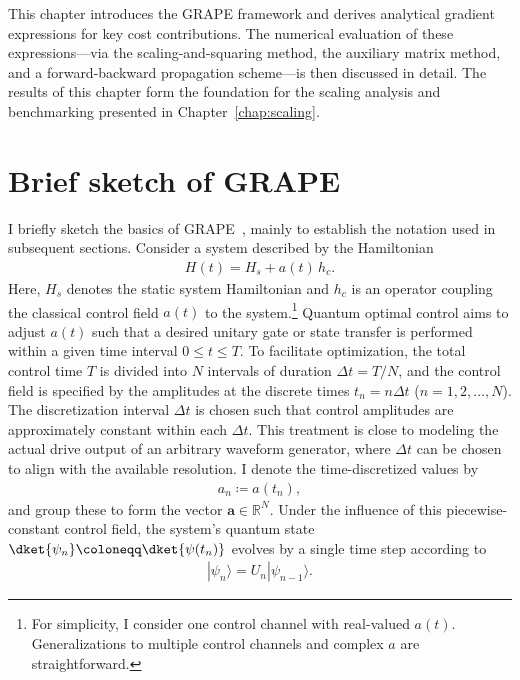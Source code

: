 This chapter introduces the GRAPE framework and derives analytical gradient expressions for key cost contributions. The numerical evaluation of these expressions---via the scaling-and-squaring method, the auxiliary matrix method, and a forward-backward propagation scheme---is then discussed in detail. The results of this chapter form the foundation for the scaling analysis and benchmarking presented in Chapter~\ref{chap:scaling}.

\section{Brief sketch of GRAPE}
\label{sec:grape_sketch}

I briefly sketch the basics of GRAPE~\cite{nmrkhaneja2005optimal}, mainly to establish the notation used in subsequent sections.
Consider a system described by the Hamiltonian
\begin{align}
\label{eq:ham}
     H(t) = H_s + a(t)\, h_c.
\end{align}
Here, $H_s$ denotes the static system Hamiltonian and $h_c$ is an operator coupling the classical control field $a(t)$ to the system.\footnote{For simplicity, I consider one control channel with real-valued $a(t)$. Generalizations to multiple control channels and complex $a$ are straightforward.}%
%
%
Quantum optimal control aims to adjust $a(t)$ such that a desired unitary gate or state transfer is performed within a given time interval $0\le t \le T$. To facilitate optimization, the total control time $T$ is divided into $N$ intervals of duration $\Delta t=T/N$, and the control field is specified by the amplitudes at the discrete times $t_n=n\Delta t$ ($n=1,2,\dots,N$). The discretization interval $\Delta t$ is chosen such that control amplitudes are approximately constant within each $\Delta t$. This treatment is close to modeling the actual drive output of an arbitrary waveform generator, where $\Delta t$ can be chosen to align with the available resolution. I denote the time-discretized values by
\begin{align}
\label{eq:an}
    a_n \coloneqq a(t_n),
\end{align}
and group these to form the vector $\textbf{a}\in \mathbb{R}^{N}$.  
Under the influence of this piecewise-constant control field, the system's quantum state $\dket{\psi_n}\coloneqq \dket{\psi(t_n)}$ evolves by a single time step according to 
\begin{align}
\label{eq:statepropagation}
  |\psi_n\rangle=U_n|\psi_{n-1}\rangle.
\end{align}
